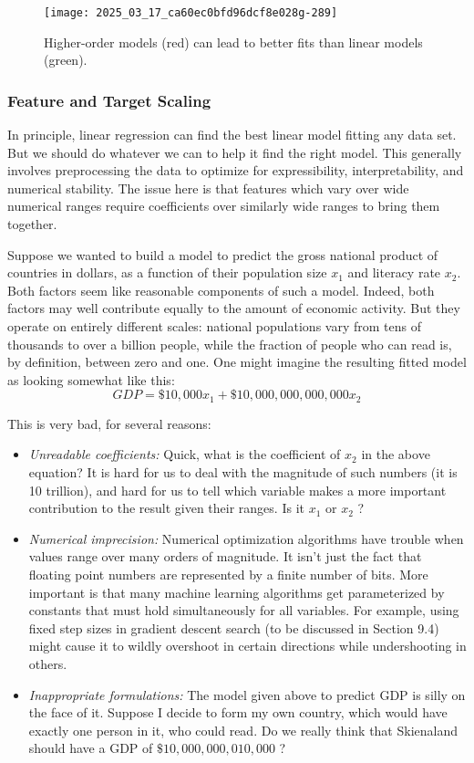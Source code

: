 \documentclass[10pt]{article}
\begin{document}
\begin{figure}[H]
\centering
\texttt{[image: 2025\_03\_17\_ca60ec0bfd96dcf8e028g-289]}
\caption{Higher-order models (red) can lead to better fits than linear models (green).}
\end{figure}

\subsubsection{Feature and Target Scaling}
In principle, linear regression can find the best linear model fitting any data set. But we should do whatever we can to help it find the right model. This generally involves preprocessing the data to optimize for expressibility, interpretability, and numerical stability. The issue here is that features which vary over wide numerical ranges require coefficients over similarly wide ranges to bring them together.

Suppose we wanted to build a model to predict the gross national product of countries in dollars, as a function of their population size $x_{1}$ and literacy rate $x_{2}$. Both factors seem like reasonable components of such a model. Indeed, both factors may well contribute equally to the amount of economic activity. But they operate on entirely different scales: national populations vary from tens of thousands to over a billion people, while the fraction of people who can read is, by definition, between zero and one. One might imagine the resulting fitted model as looking somewhat like this:
\[ GDP=\$ 10,000 x_{1}+\$ 10,000,000,000,000 x_{2} \]

This is very bad, for several reasons:
\begin{itemize}
\item \textit{Unreadable coefficients:} Quick, what is the coefficient of $x_{2}$ in the above equation? It is hard for us to deal with the magnitude of such numbers (it is 10 trillion), and hard for us to tell which variable makes a more important contribution to the result given their ranges. Is it $x_{1}$ or $x_{2}$ ?
\item \textit{Numerical imprecision:} Numerical optimization algorithms have trouble when values range over many orders of magnitude. It isn't just the fact that floating point numbers are represented by a finite number of bits. More important is that many machine learning algorithms get parameterized by constants that must hold simultaneously for all variables. For example, using fixed step sizes in gradient descent search (to be discussed in Section 9.4) might cause it to wildly overshoot in certain directions while undershooting in others.
\item \textit{Inappropriate formulations:} The model given above to predict GDP is silly on the face of it. Suppose I decide to form my own country, which would have exactly one person in it, who could read. Do we really think that Skienaland should have a GDP of $\$ 10,000,000,010,000$ ?
\end{itemize}
\end{document}
